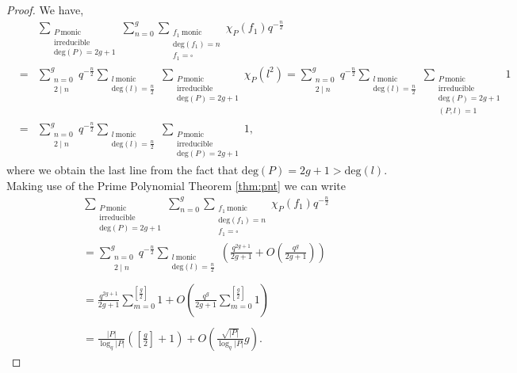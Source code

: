 \documentclass[11pt]{amsart}
\begin{document}
\begin{proof}
We have,
\begin{eqnarray}
& &\sum_{\substack{P \ \mathrm{monic} \\ \mathrm{irreducible} \\ \mathrm{deg}(P)=2g+1}}\sum_{n=0}^{g}\sum_{\substack{f_{1} \ \mathrm{monic} \\ \mathrm{deg}(f_{1})=n \\ f_{1}=\square}}\chi_{P}(f_{1})q^{-\tfrac{n}{2}}\nonumber\\
&=&\sum_{\substack{n=0 \\ 2\mid n}}^{g}q^{-\tfrac{n}{2}}\sum_{\substack{l \ \mathrm{monic} \\ \mathrm{deg}(l)=\tfrac{n}{2}}}\sum_{\substack{P \ \mathrm{monic} \\ \mathrm{irreducible} \\ \mathrm{deg}(P)=2g+1}}\chi_{P}(l^{2})=\sum_{\substack{n=0 \\ 2\mid n}}^{g}q^{-\tfrac{n}{2}}\sum_{\substack{l \ \mathrm{monic} \\ \mathrm{deg}(l)=\tfrac{n}{2}}}\sum_{\substack{P \ \mathrm{monic} \\ \mathrm{irreducible} \\ \mathrm{deg}(P)=2g+1 \\ (P,l)=1}}1\nonumber\\
&=&\sum_{\substack{n=0 \\ 2\mid n}}^{g}q^{-\tfrac{n}{2}}\sum_{\substack{l \ \mathrm{monic} \\ \mathrm{deg}(l)=\tfrac{n}{2}}}\sum_{\substack{P \ \mathrm{monic} \\ \mathrm{irreducible} \\ \mathrm{deg}(P)=2g+1}}1,\nonumber
\end{eqnarray}
where we obtain the last line from the fact that $\mathrm{deg}(P)=2g+1>\mathrm{deg}(l)$. Making use of the Prime Polynomial Theorem \ref{thm:pnt} we can write\begin{multline}
\sum_{\substack{P \ \mathrm{monic} \\ \mathrm{irreducible} \\ \mathrm{deg}(P)=2g+1}}\sum_{n=0}^{g}\sum_{\substack{f_{1} \ \mathrm{monic} \\ \mathrm{deg}(f_{1})=n \\ f_{1}=\square}}\chi_{P}(f_{1})q^{-\tfrac{n}{2}}\\
=\sum_{\substack{n=0 \\ 2\mid n}}^{g}q^{-\tfrac{n}{2}}\sum_{\substack{l \ \mathrm{monic} \\ \mathrm{deg}(l)=\tfrac{n}{2}}}\left(\frac{q^{2g+1}}{2g+1}+O\left(\frac{q^{g}}{2g+1}\right)\right)\nonumber\\ \\
=\frac{q^{2g+1}}{2g+1}\sum_{m=0}^{\left[\tfrac{g}{2}\right]}1+O\left(\frac{q^{g}}{2g+1}\sum_{m=0}^{\left[\tfrac{g}{2}\right]}1\right)\ \ \ \ \ \ \ \nonumber\\ \\
=\frac{|P|}{\log_{q}|P|}\left(\left[\frac{g}{2}\right]+1\right)+O\left(\frac{\sqrt{|P|}}{\log_{q}|P|}g\right).\ \ \ \ \ \ \ \ \ \ \ \ \ \ \ \ \ \ \ \ \ \nonumber
\end{multline}
\end{proof}
\end{document}
